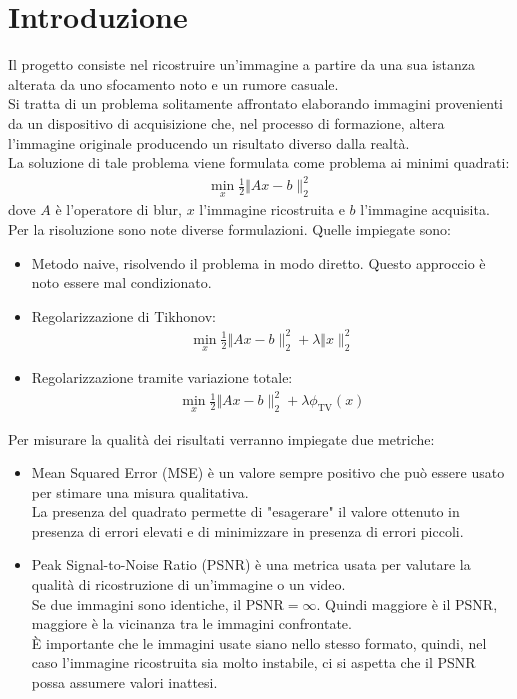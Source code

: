 \documentclass[11pt]{article}
\begin{document}
\section{Introduzione}
Il progetto consiste nel ricostruire un'immagine a partire da una sua istanza alterata da uno sfocamento noto e un rumore casuale.\\
Si tratta di un problema solitamente affrontato elaborando immagini provenienti da un dispositivo di acquisizione che, nel processo di formazione, altera l'immagine originale producendo un risultato diverso dalla realtà.\\ 
La soluzione di tale problema viene formulata come problema ai minimi quadrati:
\begin{align*}
    \min\limits_{x} \frac{1}{2} \Vert Ax-b \|_{2}^{2}
\end{align*}
dove $A$ è l'operatore di blur, $x$ l'immagine ricostruita e $b$ l'immagine acquisita.\\

Per la risoluzione sono note diverse formulazioni. Quelle impiegate sono:
\begin{itemize}
    \setlength\itemsep{0.05cm}
    \item Metodo naive, risolvendo il problema in modo diretto. Questo approccio è noto essere mal condizionato.
    \item Regolarizzazione di Tikhonov:
    \begin{align*}
    	\min\limits_{x} \frac{1}{2} \Vert Ax-b \|_{2}^{2} + \lambda \Vert x \|_{2}^{2}
    \end{align*}
    \item Regolarizzazione tramite variazione totale:
    \begin{align*}
    	\min\limits_{x} \frac{1}{2} \Vert Ax-b \|_{2}^{2} + \lambda \phi_{\text{TV}}(x)
    \end{align*}

\end{itemize}
Per misurare la qualità dei risultati verranno impiegate due metriche:
\begin{itemize}
    \setlength\itemsep{0.05cm}
    \item Mean Squared Error (MSE) è un valore sempre positivo che può essere usato per stimare una misura qualitativa. \\
    La presenza del quadrato permette di "esagerare" il valore ottenuto in presenza di errori elevati e di minimizzare in presenza di errori piccoli.
    \item Peak Signal-to-Noise Ratio (PSNR) è una metrica usata per valutare la qualità di ricostruzione di un'immagine o un video.\\
    Se due immagini sono identiche, il $\text{PSNR}=\infty$. Quindi maggiore è il PSNR, maggiore è la vicinanza tra le immagini confrontate.\\
    È importante che le immagini usate siano nello stesso formato, quindi, nel caso l'immagine ricostruita sia molto instabile, ci si aspetta che il PSNR possa assumere valori inattesi.
\end{itemize}
\end{document}

